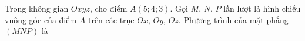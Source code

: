 \begin{ex}
Trong không gian $Oxyz$, cho điểm $A(5;4;3)$. Gọi $M$, $N$, $P$ lần lượt là hình chiếu vuông góc của điểm $A$ trên các trục $Ox$, $Oy$, $Oz$. Phương trình của mặt phẳng $(MNP)$ là
\end{ex}

